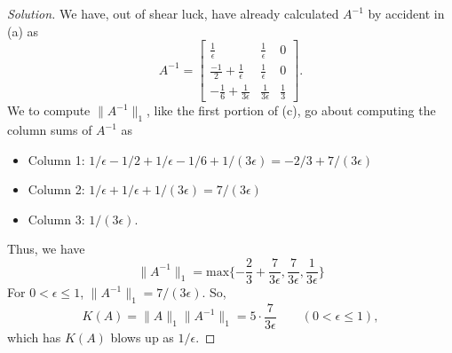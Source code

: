 \documentclass[12pt]{amsart}
\newenvironment{solution}
{\begin{proof}[Solution]}
{\end{proof}}
\begin{document}
\begin{onehalfspace}
\begin{solution}
            We have, out of shear luck, have already calculated $A^{-1}$ by accident in (a)
            as
            \begin{displaymath}
                A^{-1} = \left[\begin{matrix}
                                   \frac{1}{\epsilon} & \frac{1}{\epsilon} & 0\\
                                   \frac{-1}{2}+\frac{1}{\epsilon} & \frac{1}{\epsilon} & 0\\
                                   -\frac{1}{6}+\frac{1}{3\epsilon} & \frac{1}{3\epsilon} & \frac{1}{3}
                \end{matrix}\right].
            \end{displaymath}
            We to compute $\|A^{-1}\|_1$, like the first portion of (c), go about computing the column sums of $A^{-1}$ as
            \begin{itemize}
                \item[-] Column 1: $1/\epsilon - 1/2 + 1/\epsilon - 1/6 + 1/(3\epsilon) = -2/3 + 7/(3\epsilon)$
                \item[-] Column 2: $1/\epsilon + 1/\epsilon + 1/(3\epsilon) = 7/(3\epsilon)$
                \item[-] Column 3: $1/(3\epsilon)$.
            \end{itemize}
            Thus, we have
            \begin{displaymath}
                \|A^{-1}\|_1 = \text{max}\{-\frac{2}{3} + \frac{7}{3\epsilon},\frac{7}{3\epsilon},\frac{1}{3\epsilon}\}
            \end{displaymath}
            For $0<\epsilon\le 1$, $\|A^{-1}\|_1 = 7/(3\epsilon)$.
            So,
            \begin{displaymath}
                K(A)=\|A\|_1\|A^{-1}\|_1 = 5\cdot\frac{7}{3\epsilon} \qquad (0<\epsilon\le 1),
            \end{displaymath}
            which has $K(A)$ blows up as $1/\epsilon$.


\end{solution}
\end{onehalfspace}
\end{document}
